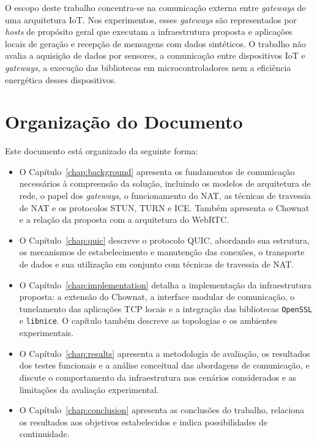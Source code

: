 O escopo deste trabalho concentra-se na comunicação externa entre \textit{gateways} de uma arquitetura IoT. Nos experimentos, esses \textit{gateways} são representados por \textit{hosts} de propósito geral que executam a infraestrutura proposta e aplicações locais de geração e recepção de mensagens com dados sintéticos. O trabalho não avalia a aquisição de dados por sensores, a comunicação entre dispositivos IoT e \textit{gateways}, a execução das bibliotecas em microcontroladores nem a eficiência energética desses dispositivos.

\section{Organização do Documento}

Este documento está organizado da seguinte forma:

\begin{itemize}
\item O Capítulo~\ref{chap:background} apresenta os fundamentos de comunicação necessários à compreensão da solução, incluindo os modelos de arquitetura de rede, o papel dos \textit{gateways}, o funcionamento do NAT, as técnicas de travessia de NAT e os protocolos STUN, TURN e ICE. Também apresenta o Chownat e a relação da proposta com a arquitetura do WebRTC.
\item O Capítulo~\ref{chap:quic} descreve o protocolo QUIC, abordando sua estrutura, os mecanismos de estabelecimento e manutenção das conexões, o transporte de dados e sua utilização em conjunto com técnicas de travessia de NAT.
\item O Capítulo~\ref{chap:implementation} detalha a implementação da infraestrutura proposta: a extensão do Chownat, a interface modular de comunicação, o tunelamento das aplicações TCP locais e a integração das bibliotecas \texttt{OpenSSL} e \texttt{libnice}. O capítulo também descreve as topologias e os ambientes experimentais.
\item O Capítulo~\ref{chap:results} apresenta a metodologia de avaliação, os resultados dos testes funcionais e a análise conceitual das abordagens de comunicação, e discute o comportamento da infraestrutura nos cenários considerados e as limitações da avaliação experimental.
\item O Capítulo~\ref{chap:conclusion} apresenta as conclusões do trabalho, relaciona os resultados aos objetivos estabelecidos e indica possibilidades de continuidade.
\end{itemize}
